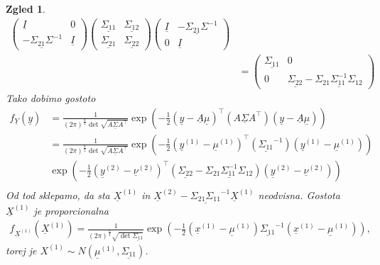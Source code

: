 \documentclass[10pt, a4paper]{article}
\newtheorem{zgled}[izr]{Zgled}
\begin{document}
\begin{zgled}
\begin{align*}
\begin{pmatrix}
        \underline{I} & 0\\
        -\underline{\Sigma_{21} \Sigma}^{-1} & \underline{I}
      \end{pmatrix}
      \begin{pmatrix}
        \underline{\Sigma_{11}} & \underline{\Sigma_{12}}\\
      \underline{\Sigma_{21}} & \underline{\Sigma_{22}}
      \end{pmatrix}
      \begin{pmatrix}
        \underline{I} & -\underline{\Sigma_{21} \Sigma}^{-1}\\
        0 & \underline{I}
      \end{pmatrix}\\
      &= \begin{pmatrix}
        \underline{\Sigma_{11}} & 0\\
        0 & \underline{\Sigma_{22}} - \underline{\Sigma_{21} \Sigma_{11}^{-1} \Sigma_{12}}
      \end{pmatrix}
    \end{align*}
    Tako dobimo gostoto
    \begin{align*}
      f_{\underline{Y}} (\underline{y}) &= \frac{1}{(2 \pi)^{\frac{n}{2}} \det \sqrt{\underline{A \Sigma A}^{\top}}} \exp\left(-\frac{1}{2} (\underline{y} - \underline{A} \underline{\mu})^\top (\underline{A \Sigma A}^\top) (\underline{y} - \underline{A} \underline{\mu})\right)\\
      &= \frac{1}{(2 \pi)^{\frac{n}{2}} \det \sqrt{\underline{A \Sigma A}^{\top}}} \exp\left(-\frac{1}{2} (\underline{y}^{(1)} - \underline{\mu}^{(1)})^\top (\underline{\Sigma_{11}}^{-1}) (\underline{y}^{(1)} - \underline{\mu}^{(1)})\right)\\
      &\exp\left(-\frac{1}{2} (\underline{y}^{(2)} - \underline{\nu}^{(2)})^\top \left(\underline{\Sigma_{22}} - \underline{\Sigma_{21} \Sigma_{11}^{-1} \Sigma_{12}}\right) (\underline{y}^{(2)} - \underline{\nu}^{(2)})\right)\\
    \end{align*}
    Od tod sklepamo, da sta $\underline{X}^{(1)}$ in $\underline{X}^{(2)} - \underline{\Sigma_{21} \Sigma_{11}}^{-1} \underline{X}^{(1)}$ neodvisna.
    Gostota $\underline{X}^{(1)}$ je proporcionalna 
    \begin{align*}
      f_{\underline{X}^{(1)}} (\underline{X}^{(1)}) = \frac{1}{(2 \pi)^{\frac{n}{2}} \sqrt{\det \underline{\Sigma_{11}}}} \exp \left(-\frac{1}{2} (\underline{x}^{(1)} - \underline{\mu}^{(1)}) \underline{\Sigma_{11}}^{-1} (\underline{x}^{(1)} - \underline{\mu}^{(1)})\right),
    \end{align*}
    torej je $X^(1) \sim N(\underline{\mu}^{(1)}, \underline{\Sigma_{11}})$.
  \end{zgled}
\end{document}
